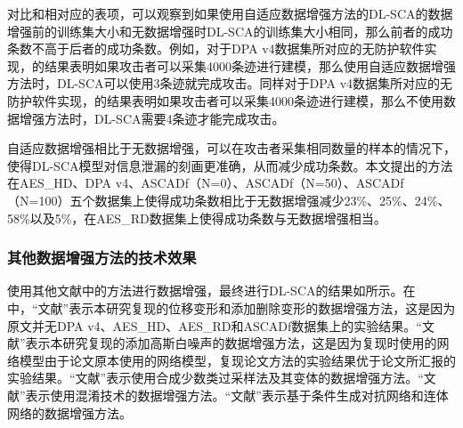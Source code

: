 {	对比和相对应的表项，可以观察到如果使用自适应数据增强方法的DL-SCA的数据增强前的训练集大小和无数据增强时DL-SCA的训练集大小相同，那么前者的成功条数不高于后者的成功条数。例如，对于DPA v4数据集所对应的无防护软件实现，的结果表明如果攻击者可以采集4000条迹进行建模，那么使用自适应数据增强方法时，DL-SCA可以使用3条迹就完成攻击。同样对于DPA v4数据集所对应的无防护软件实现，的结果表明如果攻击者可以采集4000条迹进行建模，那么不使用数据增强方法时，DL-SCA需要4条迹才能完成攻击。

	自适应数据增强相比于无数据增强，可以在攻击者采集相同数量的样本的情况下，使得DL-SCA模型对信息泄漏的刻画更准确，从而减少成功条数。本文提出的方法在AES\_HD、DPA v4、ASCADf（N=0）、ASCADf（N=50）、ASCADf（N=100）五个数据集上使得成功条数相比于无数据增强减少23\%、25\%、24\%、58\%以及5\%，在AES\_RD数据集上使得成功条数与无数据增强相当。
	\subsubsection{其他数据增强方法的技术效果}

	使用其他文献中的方法进行数据增强，最终进行DL-SCA的结果如所示。在中，“文献”表示本研究复现的\citet{Cagli17}位移变形和添加删除变形的数据增强方法，这是因为原文并无DPA v4、AES\_HD、AES\_RD和ASCADf数据集上的实验结果。“文献”表示本研究复现的\citet{Kim19}添加高斯白噪声的数据增强方法，这是因为复现时使用的网络模型由于论文原本使用的网络模型，复现论文方法的实验结果优于论文所汇报的实验结果。“文献”表示\citet{Won20}使用合成少数类过采样法及其变体的数据增强方法。“文献”表示\citet{Luo21}使用混淆技术的数据增强方法。“文献”表示\citet{Mukhtar22}基于条件生成对抗网络和连体网络的数据增强方法。

}
